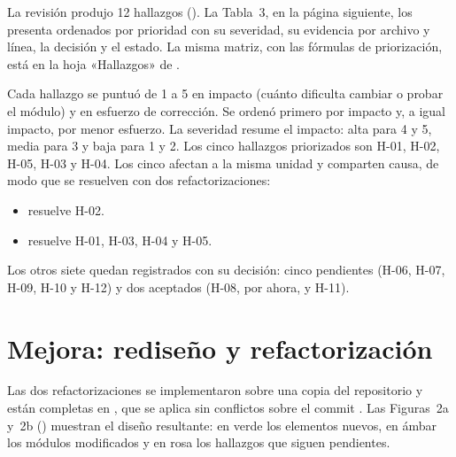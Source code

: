 \documentclass[11pt,a4paper]{article}
\begin{document}
La revisión produjo 12 hallazgos (). La Tabla~3, en la página siguiente, los presenta ordenados por prioridad con su severidad, su evidencia por archivo y línea, la decisión y el estado. La misma matriz, con las fórmulas de priorización, está en la hoja «Hallazgos» de .


 Cada hallazgo se puntuó de 1 a 5 en impacto (cuánto dificulta cambiar o probar el módulo) y en esfuerzo de corrección. Se ordenó primero por impacto y, a igual impacto, por menor esfuerzo. La severidad resume el impacto: alta para 4 y 5, media para 3 y baja para 1 y 2. Los cinco hallazgos priorizados son H-01, H-02, H-05, H-03 y H-04. Los cinco afectan a la misma unidad y comparten causa, de modo que se resuelven con dos refactorizaciones:

\begin{itemize}
  \item {} resuelve H-02.
  \item {} resuelve H-01, H-03, H-04 y H-05.
\end{itemize}

Los otros siete quedan registrados con su decisión: cinco pendientes (H-06, H-07, H-09, H-10 y H-12) y dos aceptados (H-08, por ahora, y H-11).

\section{Mejora: rediseño y refactorización}

Las dos refactorizaciones se implementaron sobre una copia del repositorio y están completas en , que se aplica sin conflictos sobre el commit . Las Figuras~2a y~2b () muestran el diseño resultante: en verde los elementos nuevos, en ámbar los módulos modificados y en rosa los hallazgos que siguen pendientes.

\end{document}
